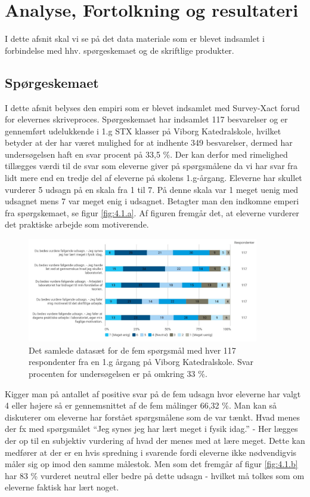 \chapter{Analyse, Fortolkning og resultateri}
\label{Ch:4}

I dette afsnit skal vi se på det data materiale som er blevet indsamlet i forbindelse med hhv. spørgeskemaet og de skriftlige produkter. 

\section{Spørgeskemaet}
\label{Sec:4.1}

I dette afsnit belyses den empiri som er blevet indsamlet med Survey-Xact forud for elevernes skriveproces. Spørgeskemaet har indsamlet 117 besvarelser og er gennemført udelukkende i 1.g STX klasser på Viborg Katedralskole, hvilket betyder at der har været mulighed for at indhente 349 besvarelser, dermed har undersøgelsen haft en svar procent på 33,5 \%. Der kan derfor med rimelighed tillægges værdi til de svar som eleverne giver på spørgsmålene da vi har svar fra lidt mere end en tredje del af eleverne på skolens 1.g-årgang. Eleverne har skullet vurderer 5 udsagn på en skala fra 1 til 7. På denne skala var 1 meget uenig med udsagnet mens 7 var meget enig i udsagnet. Betagter man den indkomne emperi fra spørgskemaet, se figur \vref{fig:4.1.a}. Af figuren fremgår det, at eleverne vurderer det praktiske arbejde som motiverende. 
\begin{figure}[h!]
	\centering
	\includegraphics[width=0.9\textwidth]{Figs/Sammenlign}
	\caption{Det samlede datasæt for de fem spørgsmål med hver 117 respondenter fra en 1.g årgang på Viborg Katedralskole. Svar procenten for undersøgelsen er på omkring 33 \%. }
	\label{fig:4.1.a}
\end{figure}
Kigger man på antallet af positive svar på de fem udsagn hvor eleverne har valgt 4 eller højere så er gennemsnittet af de fem målinger 66,32 \%. Man kan så diskuterer om eleverne har forstået spørgsmålene som de var tænkt. Hvad menes der fx med spørgsmålet ``Jeg synes jeg har lært meget i fysik idag.'' - Her lægges der op til en subjektiv vurdering af hvad der menes med at lære meget. Dette kan medfører at der er en hvis spredning i svarende fordi eleverne ikke nødvendigvis måler sig op imod den samme målestok. Men som det fremgår af figur \vref{fig:4.1.b} har 83 \% vurderet neutral eller bedre på dette udsagn - hvilket må tolkes som om eleverne faktisk har lært noget. 

